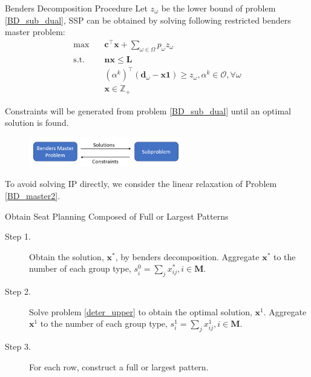 \begin{frame}{Benders Decomposition Procedure}
  \small
  Let $z_{\omega}$ be the lower bound of problem \eqref{BD_sub_dual}, SSP can be obtained by solving following restricted benders master problem:
  \begin{equation}\label{BD_master2}
    \begin{aligned}
      \max \quad & \mathbf{c}^{\intercal} \mathbf{x} + \sum_{\omega \in \Omega} p_{\omega} z_{\omega} \\
      \text {s.t.} \quad & \mathbf{n} \mathbf{x} \leq \mathbf{L} \\
      & (\alpha^{k})^{\intercal}(\mathbf{d}_{\omega}- \mathbf{x} \mathbf{1}) \geq z_{\omega}, \alpha^k \in \mathcal{O}, \forall \omega \\
       & \mathbf{x} \in \mathbb{Z}_{+}
    \end{aligned}
\end{equation} 

  Constraints will be generated from problem \eqref{BD_sub_dual} until an optimal solution is found.

  \begin{figure}[ht]
    \centering
    \includegraphics[width = 0.6\textwidth]{./images/BD.png}
  \end{figure}

  To avoid solving IP directly, we consider the linear relaxation of Problem \eqref{BD_master2}.
\end{frame}


\begin{frame}{Obtain Seat Planning Composed of Full or Largest Patterns}
      \begin{description}
        \item[Step 1.] Obtain the solution, $\mathbf{x}^{*}$, by benders decomposition. Aggregate $\mathbf{x}^{*}$ to the number of each group type, ${s}_{i}^{0} =\sum_{j} x^{*}_{ij}, i \in \mathbf{M}$.

        \item[Step 2.] Solve problem \eqref{deter_upper} to obtain the optimal solution, $\mathbf{x}^{1}$. Aggregate $\mathbf{x}^{1}$ to the number of each group type, ${s}_{i}^{1} = \sum_{j} x^{1}_{ij}, i \in \mathbf{M}$.
         
        \item[Step 3.] For each row, construct a full or largest pattern.
     \end{description}
\end{frame}

